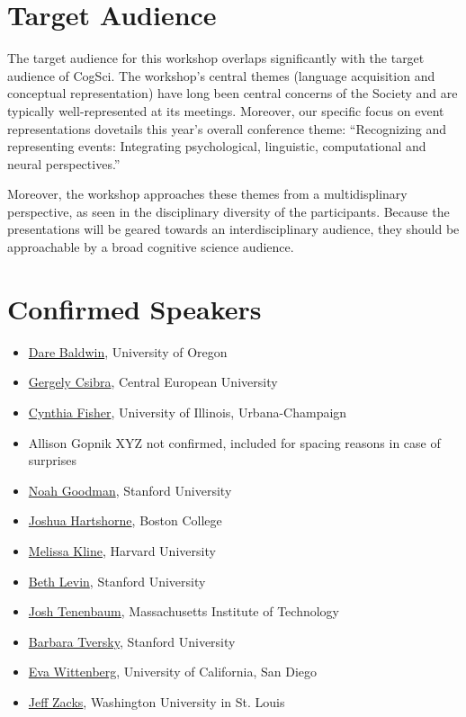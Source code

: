 \documentclass[10pt,letterpaper]{article}
\begin{document}
\section{Target Audience}

The target audience for this workshop overlaps significantly
with the target audience of CogSci. The workshop's central themes
(language acquisition and conceptual representation) have long been
central concerns of the Society and are typically well-represented at
its meetings. Moreover, our specific focus on event representations
dovetails this year's overall conference theme: ``Recognizing and
representing events: Integrating psychological, linguistic,
computational and neural perspectives.''

Moreover, the workshop approaches these themes from a
multidisplinary perspective, as seen in the disciplinary diversity of
the participants. Because the presentations will be geared towards an
interdisciplinary audience, they should be approachable by a broad
cognitive science audience.

\section{Confirmed Speakers}

\begin{itemize}
\item[] \href{http://baldwinlab.uoregon.edu/dr-dare-baldwin/}{Dare Baldwin}, University of Oregon
\item[] \href{https://people.ceu.edu/gergely_csibra}{Gergely Csibra}, Central European University  
\item[] \href{http://www.psychology.illinois.edu/people/clfishe}{Cynthia Fisher}, University of Illinois, Urbana-Champaign
\item[] Allison Gopnik XYZ not confirmed, included for spacing reasons in case of surprises
\item[] \href{http://cocolab.stanford.edu/ndg.html}{Noah Goodman}, Stanford University
\item[] \href{http://joshuakhartshorne.org/}{Joshua Hartshorne}, Boston College
\item[] \href{http://www.melissakline.net/}{Melissa Kline}, Harvard University
\item[] \href{http://web.stanford.edu/~bclevin/}{Beth Levin}, Stanford University
\item[] \href{http://web.mit.edu/cocosci/josh.html}{Josh Tenenbaum}, Massachusetts Institute of Technology
\item[] \href{http://www-psych.stanford.edu/~bt/}{Barbara Tversky}, Stanford University
\item[] \href{http://evawittenberg.com/i/start.html}{Eva Wittenberg}, University of California, San Diego  
\item[] \href{http://pages.wustl.edu/dcl/jeff-zacks/}{Jeff Zacks}, Washington University in St. Louis
\end{itemize}
\end{document}
